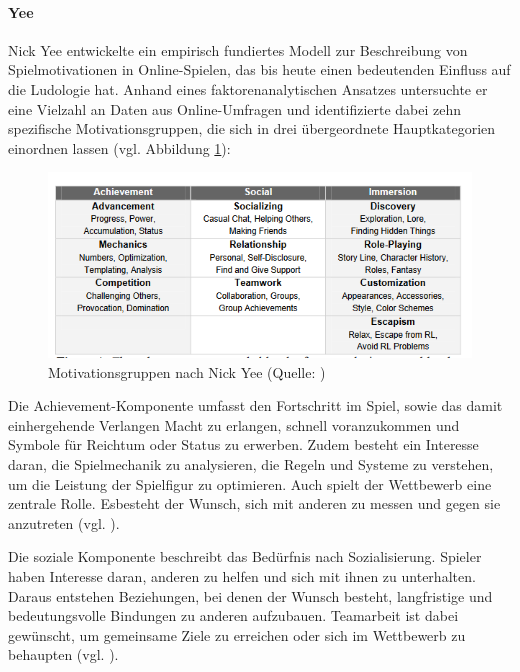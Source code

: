 \paragraph{Yee}
Nick Yee entwickelte ein empirisch fundiertes Modell zur Beschreibung von Spielmotivationen in Online-Spielen, das bis heute einen bedeutenden Einfluss auf die Ludologie hat. Anhand eines faktorenanalytischen Ansatzes untersuchte er eine Vielzahl an Daten aus Online-Umfragen und identifizierte dabei zehn spezifische Motivationsgruppen, die sich in drei übergeordnete Hauptkategorien einordnen lassen (vgl. Abbildung \ref{fig:nick_yee_motivations}):

\begin{figure}[ht]
\centering
\includegraphics[width=1\linewidth]{content/pictures/nick_yee_categorizations.PNG}
\caption{Motivationsgruppen nach Nick Yee (Quelle: \citealp[S. 5]{yee_motivations_2006})}
\label{fig:nick_yee_motivations}
\end{figure}

Die Achievement-Komponente umfasst den Fortschritt im Spiel, sowie das damit einhergehende Verlangen Macht zu erlangen, schnell voranzukommen und Symbole für Reichtum oder Status zu erwerben. Zudem besteht ein Interesse daran, die Spielmechanik zu analysieren, die Regeln und Systeme zu verstehen, um die Leistung der Spielfigur zu optimieren. Auch spielt der Wettbewerb eine zentrale Rolle. Esbesteht der Wunsch, sich mit anderen zu messen und gegen sie anzutreten (vgl. \citealp[S. 5]{yee_motivations_2006}).

Die soziale Komponente beschreibt das Bedürfnis nach Sozialisierung. Spieler haben Interesse daran, anderen zu helfen und sich mit ihnen zu unterhalten. Daraus entstehen Beziehungen, bei denen der Wunsch besteht, langfristige und bedeutungsvolle Bindungen zu anderen aufzubauen. Teamarbeit ist dabei gewünscht, um gemeinsame Ziele zu erreichen oder sich im Wettbewerb zu behaupten (vgl. \citealp[S. 6]{yee_motivations_2006}).

